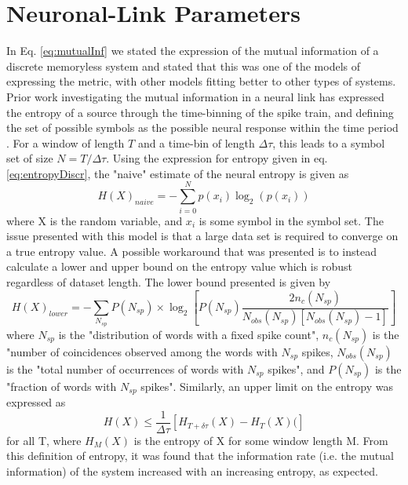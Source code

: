 \section{Neuronal-Link Parameters}
\label{chap:relWork:nrnLinkParams}
In Eq. \ref{eq:mutualInf} we stated the expression of the mutual information of a discrete memoryless system and stated that this was one of the models of expressing the metric, with other models fitting better to other types of systems. Prior work investigating the mutual information in a neural link has expressed the entropy of a source through the time-binning of the spike train, and defining the set of possible symbols as the possible neural response within the time period \cite{spikeTrainInfo}. For a window of length $T$ and a time-bin of length $\Delta\tau$, this leads to a symbol set of size $N = T/\Delta\tau$. Using the expression for entropy given in eq. \ref{eq:entropyDiscr}, the "naive" estimate of the neural entropy is given as
\begin{equation}
    \label{eq:naiveEntr}
    H(X)_{naive} = -\sum_{i=0}^{N}p(x_{i})\log_{2}(p(x_{i}))
\end{equation}
where X is the random variable, and $x_{i}$ is some symbol in the symbol set. The issue presented with this model is that a large data set is required to converge on a true entropy value. A possible workaround that was presented is to instead calculate a lower and upper bound on the entropy value which is robust regardless of dataset length. The lower bound presented is given by
\begin{equation}
    \label{eq:lowerEntr}
    H(X)_{lower} = -\sum_{N_{sp}}{P(N_{sp}) \times \log_{2}\left[P(N_{sp})\frac{2n_{c}(N_{sp})}{N_{obs}(N_{sp})[N_{obs}(N_{sp})-1]}\right]}
\end{equation}
where $N_{sp}$ is the "distribution of words with a fixed spike count", $n_{c}(N_{sp})$ is the "number of coincidences observed among the words with $N_{sp}$ spikes, $N_{obs}(N_{sp})$ is the "total number of occurrences of words with $N_{sp}$ spikes", and
$P(N_{sp})$ is the "fraction of words with $N_{sp}$ spikes". Similarly, an upper limit on the entropy was expressed as
\begin{equation}
    \label{eq:upperEntr}
    H(X) \leq \frac{1}{\Delta\tau}\left[H_{T+\delta\tau}(X) - H_{T}(X)( \right]
\end{equation}
for all T, where $H_{M}(X)$ is the entropy of X for some window length M. From this definition of entropy, it was found that the information rate (i.e. the mutual information) of the system increased with an increasing entropy, as expected.

